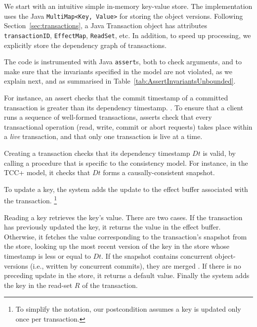 \documentclass[systeme,french,english]{compas2022}
\newcommand{\commentaire}[2][fromWhom?]{%
  {%
    \color{magenta}{\bfseries\sffamily\scriptsize$\triangleright$(#1:) #2$\triangleleft$}%
  }}
\begin{document}
\commentaire[Marc]{Pas strictement conforme au modèle : tu n'utilises pas les
  transactions mais leurs timestamps.}

We start with an intuitive simple in-memory key-value store.
The implementation uses the Java \texttt{MultiMap<Key, Value>} for
storing the object versions.
\commentaire[Marc]{Pourquoi pas une mappe <key+transaction, value>?}
Following Section~\ref{sec:transactions}, a Java Transaction object has
attributes \texttt{transactionID}, \texttt{EffectMap}, \texttt{ReadSet},
etc.
In addition, to speed up processing, we explicitly store the
dependency graph of transactions.
\commentaire[Marc]{Optimisation précoce~???}

The code is instrumented with Java \texttt{assert}s, both to check
arguments, and to make sure that the invariants specified in the model
are not violated, as we explain next, and as summarised in
Table~\ref{tab:AssertInvariantsUnbounded}.

For instance, an assert checks that the commit timestamp of a committed
transaction is greater than its dependency timestamp.
\commentaire[Marc]{Pas une postcondition, mais un invariant : si non
  commité, $Ct=+\infty$}.
To ensure that a client runs a sequence of well-formed transactions,
asserts check that every transactional operation (read, write, commit or
abort requests) takes place within a \emph{live} transaction, and that
only one transaction is live at a time.

Creating a transaction checks that its dependency timestamp $Dt$ is
valid, by calling a procedure that is specific to the consistency model.
For instance, in the TCC+ model, it checks that $Dt$ forms a
causally-consistent snapshot.

\commentaire[Marc]{En fait ce n'est pas une précondition de start-transaction, c'est un
  invariant, car read peut faire avancer le snapshot (cf.~Ayush).}

To update a key, the system adds the update to the effect buffer
associated with the transaction.%
%
\footnote{
%
  To simplify the notation, our postcondition assumes a key is updated
  only once per transaction.
}
%

Reading a key retrieves the key's value.
There are two cases.
If the transaction has previously updated the key, it returns the value
in the effect buffer.
Otherwise, it fetches the value corresponding to the transaction's
snapshot from the store, looking up the most recent version of the key
in the store whose timestamp is less or equal to $\mathit{Dt}$.
If the snapshot contains concurrent object-versions (i.e., written by
concurrent commits), they are merged \cite{syn:rep:sh143}.
If there is no preceding update in the store, it returns a default
value.
Finally the system adds the key in the read-set $R$ of the transaction. 
\end{document}
